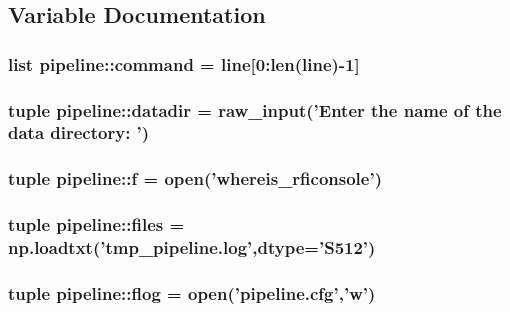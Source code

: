 \subsection{\-Variable \-Documentation}
\hypertarget{namespacepipeline_aba26565fe80f75bd4b4aaaad740095d6}{
\subsubsection[{command}]{\setlength{\rightskip}{0pt plus 5cm}list {\bf pipeline\-::command} = {\bf line}\mbox{[}0\-:len({\bf line})-\/1\mbox{]}}}\label{namespacepipeline_aba26565fe80f75bd4b4aaaad740095d6}
\hypertarget{namespacepipeline_ac80264ca3205ed250219160b6187dff9}{
\subsubsection[{datadir}]{\setlength{\rightskip}{0pt plus 5cm}tuple {\bf pipeline\-::datadir} = raw\-\_\-input('\-Enter the name of the data directory\-: ')}}\label{namespacepipeline_ac80264ca3205ed250219160b6187dff9}
\hypertarget{namespacepipeline_a588e4fbfb4e0417f484202a3b99b6246}{
\subsubsection[{f}]{\setlength{\rightskip}{0pt plus 5cm}tuple {\bf pipeline\-::f} = open('whereis\-\_\-rficonsole')}}\label{namespacepipeline_a588e4fbfb4e0417f484202a3b99b6246}
\hypertarget{namespacepipeline_a9c3dea94f17dc5a1da55cb9ca7dea740}{
\subsubsection[{files}]{\setlength{\rightskip}{0pt plus 5cm}tuple {\bf pipeline\-::files} = np.\-loadtxt('tmp\-\_\-pipeline.\-log',dtype='\-S512')}}\label{namespacepipeline_a9c3dea94f17dc5a1da55cb9ca7dea740}
\hypertarget{namespacepipeline_a325f1a801713a0281d349dfbff21cb78}{
\subsubsection[{flog}]{\setlength{\rightskip}{0pt plus 5cm}tuple {\bf pipeline\-::flog} = open('pipeline.\-cfg','w')}}\label{namespacepipeline_a325f1a801713a0281d349dfbff21cb78}
